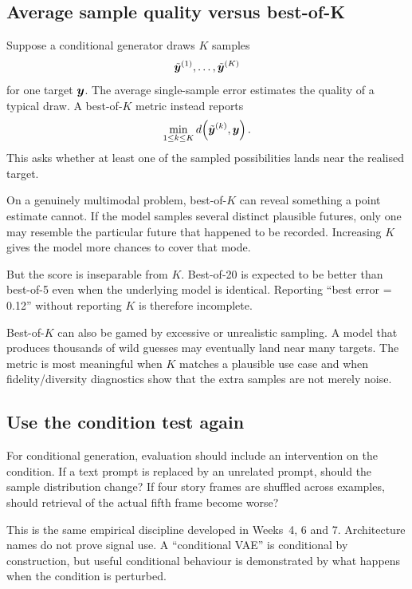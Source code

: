 \subsection{Average sample quality versus best-of-\texorpdfstring{K}{K}}

Suppose a conditional generator draws \(K\) samples
\[
  \tilde{\bm{y}}^{(1)},\ldots,\tilde{\bm{y}}^{(K)}
\]
for one target \(\bm{y}\). The average single-sample error estimates the quality of a typical draw. A best-of-\(K\) metric instead reports
\begin{equation}
  \min_{1\le k\le K}
  d\!\left(\tilde{\bm{y}}^{(k)},\bm{y}\right).
  \label{eq:week8-bestofk}
\end{equation}
This asks whether at least one of the sampled possibilities lands near the realised target.

On a genuinely multimodal problem, best-of-\(K\) can reveal something a point estimate cannot. If the model samples several distinct plausible futures, only one may resemble the particular future that happened to be recorded. Increasing \(K\) gives the model more chances to cover that mode.

But the score is inseparable from \(K\). Best-of-20 is expected to be better than best-of-5 even when the underlying model is identical. Reporting ``best error = 0.12'' without reporting \(K\) is therefore incomplete.

Best-of-\(K\) can also be gamed by excessive or unrealistic sampling. A model that produces thousands of wild guesses may eventually land near many targets. The metric is most meaningful when \(K\) matches a plausible use case and when fidelity/diversity diagnostics show that the extra samples are not merely noise.

\subsection{Use the condition test again}

For conditional generation, evaluation should include an intervention on the condition. If a text prompt is replaced by an unrelated prompt, should the sample distribution change? If four story frames are shuffled across examples, should retrieval of the actual fifth frame become worse?

This is the same empirical discipline developed in Weeks~4, 6 and 7. Architecture names do not prove signal use. A ``conditional VAE'' is conditional by construction, but useful conditional behaviour is demonstrated by what happens when the condition is perturbed.


